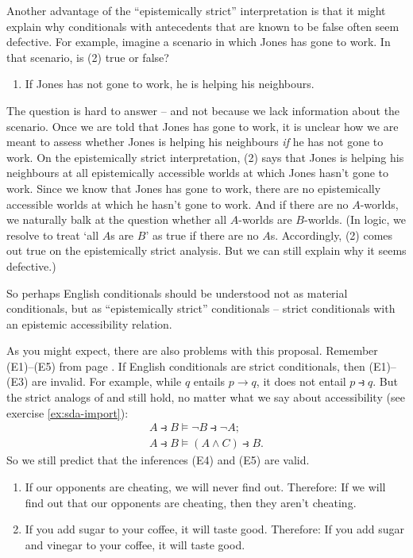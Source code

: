 Another advantage of the ``epistemically strict'' interpretation is that it
might explain why conditionals with antecedents that are known to be false often
seem defective. For example, imagine a scenario in which Jones has gone to work.
In that scenario, is (2) true or false?
\begin{enumerate}[leftmargin=10mm]
  \item[(2)] If Jones has not gone to work, he is helping his neighbours.
\end{enumerate}
The question is hard to answer -- and not because we lack information about the
scenario. Once we are told that Jones has gone to work, it is unclear how we are
meant to assess whether Jones is helping his neighbours \emph{if} he has not
gone to work. On the epistemically strict interpretation, (2) says that Jones is
helping his neighbours at all epistemically accessible worlds at which Jones
hasn't gone to work. Since we know that Jones has gone to work, there are no
epistemically accessible worlds at which he hasn't gone to work. And if there
are no $A$-worlds, we naturally balk at the question whether all $A$-worlds
are $B$-worlds. (In logic, we resolve to treat `all $A$s are $B$' as true if
there are no $A$s. Accordingly, (2) comes out true on the epistemically strict
analysis. But we can still explain why it seems defective.)

So perhaps English conditionals should be understood not as material
conditionals, but as ``epistemically strict'' conditionals -- strict
conditionals with an epistemic accessibility relation.

As you might expect, there are also problems with this proposal. Remember (E1)--(E5)
from page \pageref{paradoxes-mat-imp}. If English conditionals are strict
conditionals, then (E1)--(E3) are invalid. For example, while $q$ entails
$p \to q$, it does not entail $p \strictif q$. But the strict analogs of 
and  still hold, no matter what we say about accessibility (see exercise
\ref{ex:sda-import}):
\begin{gather*}
  A \strictif B \models \neg B\strictif \neg A;\\
  A \strictif B \models (A\land C) \strictif  B.
\end{gather*}
So we still predict that the inferences (E4) and (E5) are valid.

\begin{enumerate}[leftmargin=12mm]
  \itemsep1mm
  \item[(E4)] If our opponents are cheating, we will never find out. Therefore:
        If we will find out that our opponents are cheating, then they aren't
        cheating.
  \item[(E5)] If you add sugar to your coffee, it will taste good. Therefore: If
        you add sugar and vinegar to your coffee, it will taste good.
\end{enumerate}

